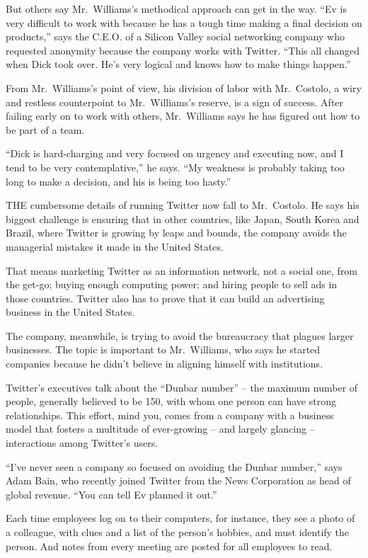 ﻿\documentclass[12pt]{article}
\begin{document}
But others say Mr.~Williams's methodical approach can get in the way. ``Ev is very difficult to work
with because he has a tough time making a final decision on products,'' says the C.E.O. of a Silicon
Valley social networking company who requested anonymity because the company works with Twitter.
``This all changed when Dick took over. He's very logical and knows how to make things happen.''

From Mr.~Williams's point of view, his division of labor with Mr.~Costolo, a wiry and restless
counterpoint to Mr.~Williams's reserve, is a sign of success. After failing early on to work with
others, Mr.~Williams says he has figured out how to be part of a team.

``Dick is hard-charging and very focused on urgency and executing now, and I tend to be very
contemplative,'' he says. ``My weakness is probably taking too long to make a decision, and his is
being too hasty.''

THE cumbersome details of running Twitter now fall to Mr.~Costolo. He says his biggest challenge is
ensuring that in other countries, like Japan, South Korea and Brazil, where Twitter is growing by
leaps and bounds, the company avoids the managerial mistakes it made in the United States.

That means marketing Twitter as an information network, not a social one, from the get-go; buying
enough computing power; and hiring people to sell ads in those countries. Twitter also has to prove
that it can build an advertising business in the United States.

The company, meanwhile, is trying to avoid the bureaucracy that plagues larger businesses. The topic
is important to Mr.~Williams, who says he started companies because he didn't believe in aligning
himself with institutions.

Twitter's executives talk about the ``Dunbar number'' -- the maximum number of people, generally
believed to be 150, with whom one person can have strong relationships. This effort, mind you, comes
from a company with a business model that fosters a multitude of ever-growing -- and largely
glancing -- interactions among Twitter's users.

``I've never seen a company so focused on avoiding the Dunbar number,'' says Adam Bain, who recently
joined Twitter from the News Corporation as head of global revenue. ``You can tell Ev planned it
out.''

Each time employees log on to their computers, for instance, they see a photo of a colleague, with
clues and a list of the person's hobbies, and must identify the person. And notes from every meeting
are posted for all employees to read.
\end{document}
